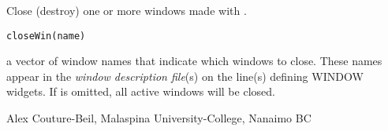 \documentclass[letterpaper]{book}
\begin{document}
\begin{Description}\relax
Close (destroy) one or more windows made with .
\end{Description}
\begin{Usage}
\begin{verbatim}closeWin(name)\end{verbatim}
\end{Usage}
\begin{Arguments}
\begin{ldescription}
\item[\code{name}] a vector of window names that indicate which windows to close. These 
names appear in the \emph{window description file}(s) on the line(s) defining WINDOW widgets.
If  is omitted, all active windows will be closed.
\end{ldescription}
\end{Arguments}
\begin{Author}\relax
Alex Couture-Beil, Malaspina University-College, Nanaimo BC
\end{Author}
\begin{SeeAlso}\relax
{}
\end{SeeAlso}
\end{document}
